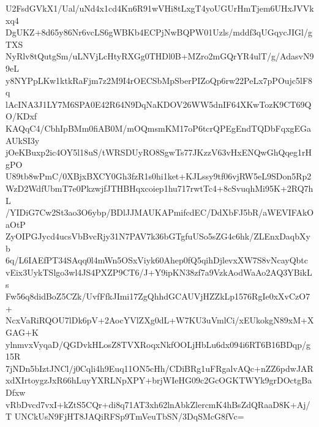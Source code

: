 U2FsdGVkX1/Ual/uNd4x1cd4Kn6R91wVHi8tLxgT4yoUGUrHmTjem6UHxJVVkxq4
DgUKZ+8d65y86Nr6vcLS6gWBKb4ECPjNwBQPW01Uzls/mddf3qUGqycJIGl/gTXS
NyRlv8tQutgSm/uLNVjLcHtyRXGg0THDl0B+MZro2mGQrYR4ulT/g/AdasvN99eL
y8NYPpLKw1ktkRaFjm7z2M9I4rOECSbMpSberPIZoQp6rw22PeLx7pPOujc5lF8q
lAcINA3J1LY7M6SPA0E42R64N9DqNaKDOV26WW5dnIF64XKwTozK9CT69QO/KDxf
KAQqC4/CbhIpBMm0fiAB0M/mOQmsmKM17oP6tcrQPEgEndTQDbFqxgEGaAUkSI3y
jOeKBuxp2ic4OY5l18uS/tWRSDUyRO8SgwTs77JKzzV63vHxENQwGhQqeg1rHgPO
U89tb8wPmC/0XBjxBXCY0Gh3fzR1s0hi1ket+KJLssy9tf06vjRW5eL9SDon5Rp2
WzD2WdfUbmT7e0PkzwjfJTHBHqxcoiep1hu717rwtTc4+8cSvuqhMi95K+2RQ7hL
/YIDiG7Cw2St3ao3O6ybp/BDlJJMAUKAPmifcdEC/DdXbFJ5bR/aWEVIFAkOaOtP
ZyOIPGJycd4ucsVbBvcRjy31N7PAV7k36bGTgfuUSo5sZG4c6hk/ZLEnxDaqbXyb
6q/L6IAEfPT34SAqq0l4mWn5OSxViyk60Ahep0fQ5qihDjlevxXW7S8vNcayQbtc
vEix3UykTSlgo3wl4JS4PXZP9CT6/J+Y9ipKN38zf7a9VzkAodWaAo2AQ3YBikLs
Fw56q8didBoZ5CZk/UvfFfkJImi17ZgQhhdGCAUVjHZZkLp1576RgIe0xXvCzO7+
NcxVaRiRQOU7lDk6pV+2AocYVlZXg0dL+W7KU3uVmlCi/xEUkokgN89xM+XGAG+K
ylnmvxVyqaD/QGDvkHLosZ8TVXRoqxNkfOOLjHbLu6dx094i6RT6B16BDqp/g15R
7jNDn5bIztJNCl/j0Cqli4h9Euq11ON5cHh/CDiBRg1uFRgalvAQc+nZZ6pdwJAR
xdXIrtoygzJxR66hLuyYXRLNpXPY+brjWIeHG09c2GcOGKTWYk9grDOctgBaDfxw
vRbDvcd7vxI+kZtS5CQr+di8q71AT3xh62lnAbkZlercmK4hBsZdQRaaD8K+Aj/T
UNCkUsN9FjHT8JAQiRFSp9TmVeuTbSN/3DqSMcG8fVc=

